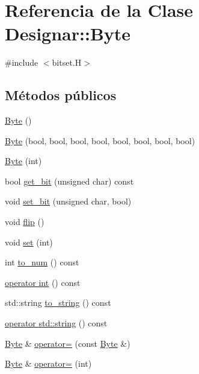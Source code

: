 \hypertarget{class_designar_1_1_byte}{}\section{Referencia de la Clase Designar\+:\+:Byte}
\label{class_designar_1_1_byte}


{\ttfamily \#include $<$bitset.\+H$>$}

\subsection*{Métodos públicos}
\begin{DoxyCompactItemize}
\item 
\hyperlink{class_designar_1_1_byte_a336815c676347de4aa09bc6342169f63}{Byte} ()
\item 
\hyperlink{class_designar_1_1_byte_a21d54a921b6f2e30c189ae2998c40188}{Byte} (bool, bool, bool, bool, bool, bool, bool, bool)
\item 
\hyperlink{class_designar_1_1_byte_a0ca92bbee262c55827eb6b2c1ebaa39e}{Byte} (int)
\item 
bool \hyperlink{class_designar_1_1_byte_a9f14a28a82353d48a802000c6de20c8e}{get\+\_\+bit} (unsigned char) const
\item 
void \hyperlink{class_designar_1_1_byte_a2d80ae64ad8316128d9217134f075721}{set\+\_\+bit} (unsigned char, bool)
\item 
void \hyperlink{class_designar_1_1_byte_abb173606939fe9f5e1c7db0180aba9b0}{flip} ()
\item 
void \hyperlink{class_designar_1_1_byte_a4e4336c19295313fc80e27ce40a69284}{set} (int)
\item 
int \hyperlink{class_designar_1_1_byte_a1f10a6e5ad399f62c0d53ace68c7e43d}{to\+\_\+num} () const
\item 
\hyperlink{class_designar_1_1_byte_a807f2afe5c5d15112b2a349e54142265}{operator int} () const
\item 
std\+::string \hyperlink{class_designar_1_1_byte_afddf5962874234208805ece07f31916d}{to\+\_\+string} () const
\item 
\hyperlink{class_designar_1_1_byte_ac37e3eaea04d1bdb09b04a1dd94a852d}{operator std\+::string} () const
\item 
\hyperlink{class_designar_1_1_byte}{Byte} \& \hyperlink{class_designar_1_1_byte_ab139736eebd931cb54f89fa2b01964fb}{operator=} (const \hyperlink{class_designar_1_1_byte}{Byte} \&)
\item 
\hyperlink{class_designar_1_1_byte}{Byte} \& \hyperlink{class_designar_1_1_byte_a1bc5154efe3f2ca906bbdd8c1d9b56ff}{operator=} (int)

\end{DoxyCompactItemize}
